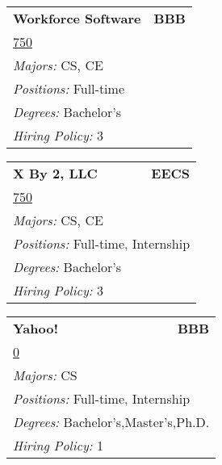 \documentclass[twoside]{article}
\begin{document}
\begin{center}
\begin{multicols}{3}
\begin{FlushLeft}
\begin{minipage}{\columnwidth}
\end{minipage}
 
\begin{minipage}{\columnwidth}\begin{tabularx}{.95\columnwidth}{Xr}
                 {\Large\bf Workforce Software} & {\Large\bf BBB}\\
    \multicolumn{2}{p{.95\columnwidth}}{\url{750}}\\
    \multicolumn{2}{p{.95\columnwidth}}{\emph{Majors:} CS, CE}\\
    \multicolumn{2}{p{.95\columnwidth}}{\emph{Positions:} Full-time}\\
    \multicolumn{2}{p{.95\columnwidth}}{\emph{Degrees:} Bachelor's}\\
    \multicolumn{2}{p{.95\columnwidth}}{\emph{Hiring Policy:} 3}\\
    \end{tabularx}
    
\end{minipage}
 
\begin{minipage}{\columnwidth}\begin{tabularx}{.95\columnwidth}{Xr}
                 {\Large\bf X By 2, LLC} & {\Large\bf EECS}\\
    \multicolumn{2}{p{.95\columnwidth}}{\url{750}}\\
    \multicolumn{2}{p{.95\columnwidth}}{\emph{Majors:} CS, CE}\\
    \multicolumn{2}{p{.95\columnwidth}}{\emph{Positions:} Full-time, Internship}\\
    \multicolumn{2}{p{.95\columnwidth}}{\emph{Degrees:} Bachelor's}\\
    \multicolumn{2}{p{.95\columnwidth}}{\emph{Hiring Policy:} 3}\\
    \end{tabularx}
    
\end{minipage}
 
\begin{minipage}{\columnwidth}\begin{tabularx}{.95\columnwidth}{Xr}
                 {\Large\bf Yahoo!} & {\Large\bf BBB}\\
    \multicolumn{2}{p{.95\columnwidth}}{\url{0}}\\
    \multicolumn{2}{p{.95\columnwidth}}{\emph{Majors:} CS}\\
    \multicolumn{2}{p{.95\columnwidth}}{\emph{Positions:} Full-time, Internship}\\
    \multicolumn{2}{p{.95\columnwidth}}{\emph{Degrees:} Bachelor's,Master's,Ph.D.}\\
    \multicolumn{2}{p{.95\columnwidth}}{\emph{Hiring Policy:} 1}\\
    \end{tabularx}
    

\end{minipage}
\end{FlushLeft}
\end{multicols}
\end{center}
\end{document}
